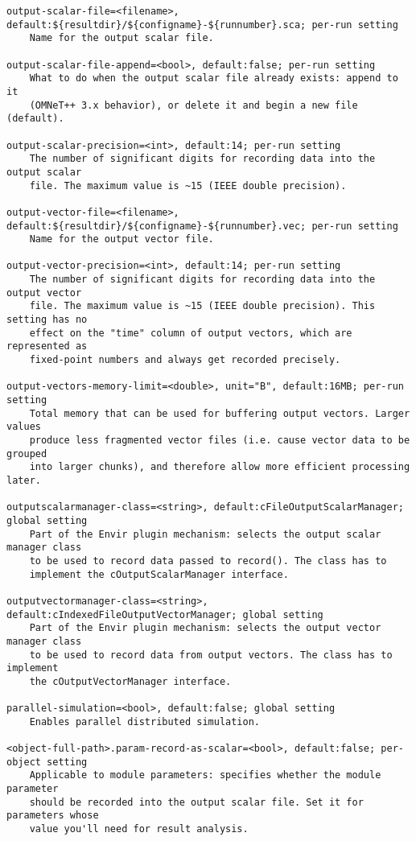 \begin{verbatim}
output-scalar-file=<filename>, default:${resultdir}/${configname}-${runnumber}.sca; per-run setting
    Name for the output scalar file.

output-scalar-file-append=<bool>, default:false; per-run setting
    What to do when the output scalar file already exists: append to it
    (OMNeT++ 3.x behavior), or delete it and begin a new file (default).

output-scalar-precision=<int>, default:14; per-run setting
    The number of significant digits for recording data into the output scalar
    file. The maximum value is ~15 (IEEE double precision).

output-vector-file=<filename>, default:${resultdir}/${configname}-${runnumber}.vec; per-run setting
    Name for the output vector file.

output-vector-precision=<int>, default:14; per-run setting
    The number of significant digits for recording data into the output vector
    file. The maximum value is ~15 (IEEE double precision). This setting has no
    effect on the "time" column of output vectors, which are represented as
    fixed-point numbers and always get recorded precisely.

output-vectors-memory-limit=<double>, unit="B", default:16MB; per-run setting
    Total memory that can be used for buffering output vectors. Larger values
    produce less fragmented vector files (i.e. cause vector data to be grouped
    into larger chunks), and therefore allow more efficient processing later.

outputscalarmanager-class=<string>, default:cFileOutputScalarManager; global setting
    Part of the Envir plugin mechanism: selects the output scalar manager class
    to be used to record data passed to record(). The class has to
    implement the cOutputScalarManager interface.

outputvectormanager-class=<string>, default:cIndexedFileOutputVectorManager; global setting
    Part of the Envir plugin mechanism: selects the output vector manager class
    to be used to record data from output vectors. The class has to implement
    the cOutputVectorManager interface.

parallel-simulation=<bool>, default:false; global setting
    Enables parallel distributed simulation.

<object-full-path>.param-record-as-scalar=<bool>, default:false; per-object setting
    Applicable to module parameters: specifies whether the module parameter
    should be recorded into the output scalar file. Set it for parameters whose
    value you'll need for result analysis.


\end{verbatim}
